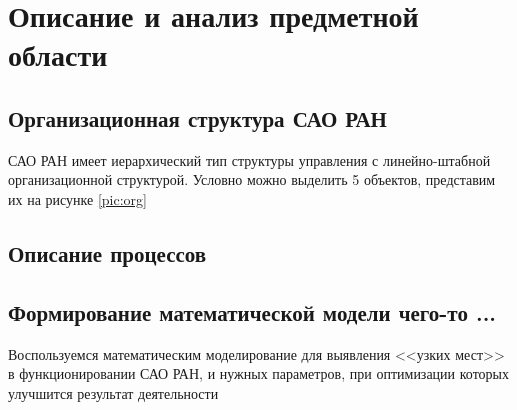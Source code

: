 \section{Описание и анализ предметной области}
\begin{comment}

пример рисунка
\addimghere{photo.jpg}{0.25}{1}{1}
\subsection{пример второго уровня заголовка}
пример таблицы 
\begin{table}[H]
\caption{Исправьте это на подпись к таблице}
\label{tabular:timesandtenses}
\begin{center}
\begin{tabular}{ccc}
Расширение краёв: & \textbf{1,0-1,4} & размер ФРТ \\
Аподизация: & \textbf{0,25-0,30} & размер ФРТ \\
Сглаживания краёв: & \textbf{0,25-0,50}& размер ФРТ \\
\end{tabular}
\end{center}
\end{table}
\end{comment}

\subsection{Организационная структура САО РАН}
САО РАН имеет иерархический тип структуры управления с линейно-штабной организационной структурой. Условно можно выделить 5 объектов, представим их  на рисунке \ref{pic:org}
\subsection{Описание процессов}
\subsection{Формирование математической модели чего-то ...}
Воспользуемся математическим моделирование для выявления <<узких мест>> в функционировании САО РАН, и нужных параметров, при оптимизации которых улучшится результат деятельности

